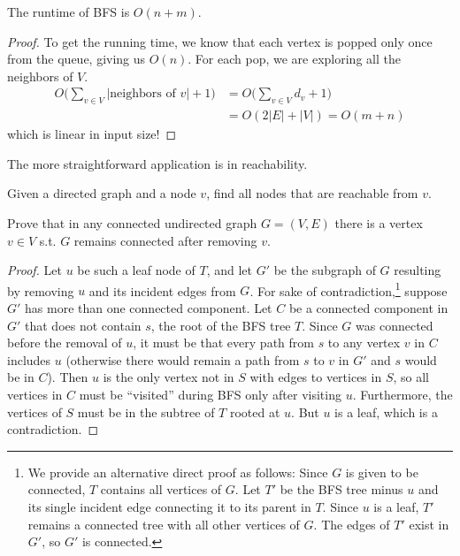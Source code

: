   \begin{theorem}
    The runtime of BFS is $O(n+m)$. 
  \end{theorem}
  \begin{proof}
    To get the running time, we know that each vertex is popped only once from the queue, giving us $O(n)$. For each pop, we are exploring all the neighbors of $V$. 
    \begin{align}
      O \bigg( \sum_{v \in V} | \text{neighbors of } v| + 1\bigg) & = O \bigg( \sum_{v \in V} d_v + 1 \bigg) \\
                                           & = O (2 |E| + |V|) = O(m + n )
    \end{align}
    which is linear in input size!  
  \end{proof}

  The more straightforward application is in reachability. 

  \begin{example}[Reachability]
    Given a directed graph and a node $v$, find all nodes that are reachable from $v$. 
  \end{example}

  \begin{exercise}
    Prove that in any connected undirected graph $G = (V, E)$ there is a vertex $v \in V$ s.t. $G$ remains connected after removing $v$. 
  \end{exercise}
  \begin{proof}
    Let $u$ be such a leaf node of $T$, and let $G'$ be the subgraph of $G$ resulting by removing $u$ and its incident edges from $G$.
    For sake of contradiction,\footnote{We provide an alternative direct proof as follows: Since $G$ is given to be connected, $T$ contains all vertices of $G$. Let $T'$ be the BFS tree minus $u$ and its single incident edge connecting it to its parent in $T$. Since $u$ is a leaf, $T'$ remains a connected tree with all other vertices of $G$. The edges of $T'$ exist in $G'$, so $G'$ is connected.} suppose $G'$ has more than one connected component.
    Let $C$ be a connected component in $G'$ that does not contain $s$, the root of the BFS tree $T$.
    Since $G$ was connected before the removal of $u$, it must be that every path from $s$ to any vertex $v$ in $C$ includes $u$ (otherwise there would remain a path from $s$ to $v$ in $G'$ and $s$ would be in $C$).
    Then $u$ is the only vertex not in $S$ with edges to vertices in $S$, so all vertices in $C$ must be ``visited'' during BFS only after visiting $u$. Furthermore, the vertices of $S$ must be in the subtree of $T$ rooted at $u$. But $u$ is a leaf, which is a contradiction.
  \end{proof}

